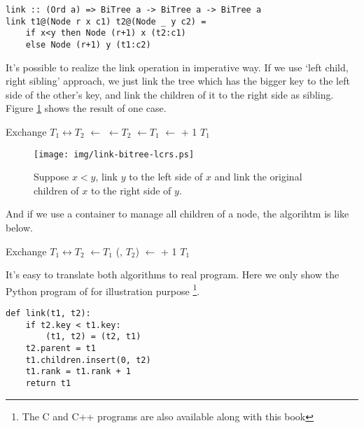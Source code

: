 \documentclass{article}
\begin{document}
\lstset{language=Haskell}
\begin{lstlisting}
link :: (Ord a) => BiTree a -> BiTree a -> BiTree a
link t1@(Node r x c1) t2@(Node _ y c2) = 
    if x<y then Node (r+1) x (t2:c1)
    else Node (r+1) y (t1:c2)
\end{lstlisting}

It's possible to realize the link operation in imperative way.
If we use `left child, right sibling' approach, we just link
the tree which has the bigger key to the left side of the other's
key, and link the children of it to the right side as sibling.
Figure \ref{fig:link-lcrs} shows the result of one case.

\begin{algorithmic}[1]
    \State Exchange $T_1 \leftrightarrow T_2$
  \EndIf
  \State {} $\gets$ 
  \State {} $\gets T_2$
  \State {} $\gets T_1$
  \State {} $\gets$  + 1
  \State \Return $T_1$
\EndFunction
\end{algorithmic}

\begin{figure}[htbp]
  \centering
  \texttt{[image: img/link-bitree-lcrs.ps]}
  \caption{Suppose $x < y$, link $y$ to the left side of $x$ and link the original children of $x$ to the right side of $y$.} \label{fig:link-lcrs}
\end{figure}

And if we use a container to manage all children of a node, the
algorihtm is like below.

\begin{algorithmic}[1]
    \State Exchange $T_1 \leftrightarrow T_2$
  \EndIf
  \State {} $\gets T_1$
  \State {}(, $T_2$)
  \State {} $\gets$  + 1
  \State \Return $T_1$
\EndFunction
\end{algorithmic}

It's easy to translate both algorithms to real program. Here we only show the Python program of  for illustration purpose \footnote{The C and C++ programs are also available along with this book}.

\begin{lstlisting}
def link(t1, t2):
    if t2.key < t1.key:
        (t1, t2) = (t2, t1)
    t2.parent = t1
    t1.children.insert(0, t2)
    t1.rank = t1.rank + 1
    return t1
\end{lstlisting}
\end{document}
